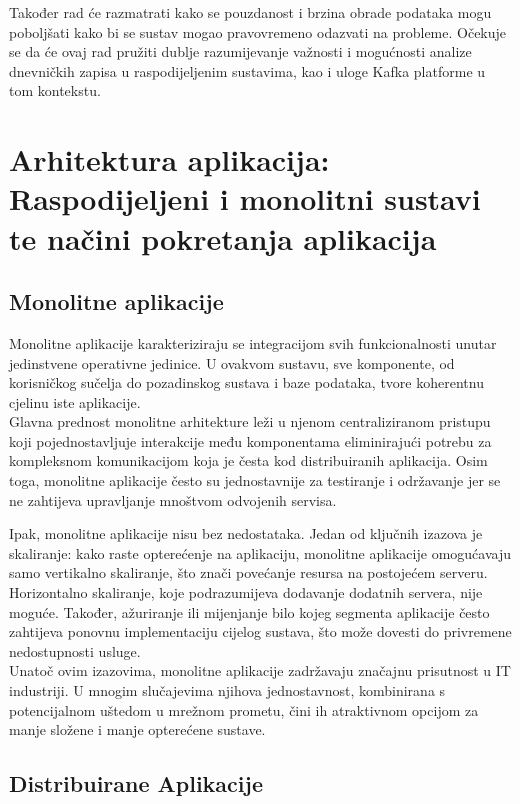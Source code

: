 \documentclass[times, utf8, diplomski]{fer}
\begin{document}
Također rad će razmatrati kako se pouzdanost i brzina obrade podataka mogu poboljšati kako bi se sustav mogao pravovremeno odazvati na probleme. Očekuje se da će ovaj rad pružiti dublje razumijevanje važnosti i mogućnosti analize dnevničkih zapisa u raspodijeljenim sustavima, kao i uloge Kafka platforme u tom kontekstu.

\chapter{Arhitektura aplikacija: Raspodijeljeni i monolitni sustavi te načini pokretanja aplikacija}

\section{Monolitne aplikacije}

Monolitne aplikacije karakteriziraju se integracijom svih funkcionalnosti unutar jedinstvene operativne jedinice. U ovakvom sustavu, sve komponente, od korisničkog sučelja do pozadinskog sustava i baze podataka, tvore koherentnu cjelinu iste aplikacije. \\

Glavna prednost monolitne arhitekture leži u njenom centraliziranom pristupu koji pojednostavljuje interakcije među komponentama eliminirajući potrebu za kompleksnom komunikacijom koja je česta kod distribuiranih aplikacija. Osim toga, monolitne aplikacije često su jednostavnije za testiranje i održavanje jer se ne zahtijeva upravljanje mnoštvom odvojenih servisa. 

Ipak, monolitne aplikacije nisu bez nedostataka. Jedan od ključnih izazova je skaliranje: kako raste opterećenje na aplikaciju, monolitne aplikacije omogućavaju samo vertikalno skaliranje, što znači povećanje resursa na postojećem serveru. Horizontalno skaliranje, koje podrazumijeva dodavanje dodatnih servera, nije moguće. Također, ažuriranje ili mijenjanje bilo kojeg segmenta aplikacije često zahtijeva ponovnu implementaciju  cijelog sustava, što može dovesti do privremene nedostupnosti usluge. \\

Unatoč ovim izazovima, monolitne aplikacije zadržavaju značajnu prisutnost u IT industriji. U mnogim slučajevima njihova jednostavnost, kombinirana s potencijalnom uštedom u mrežnom prometu, čini ih atraktivnom opcijom za manje složene i manje opterećene sustave.

\section{Distribuirane Aplikacije}
\end{document}
